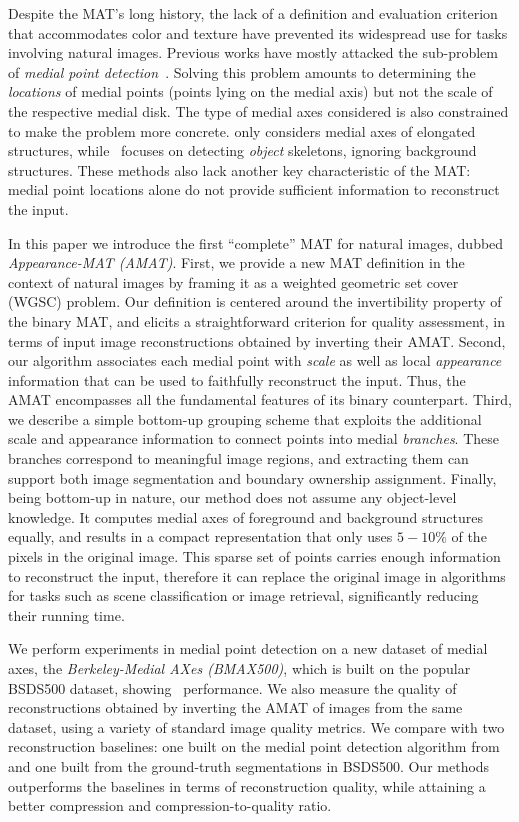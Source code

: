 \documentclass[10pt,twocolumn,letterpaper]{article}
\begin{document}
Despite the MAT's long history, the lack of a definition and evaluation criterion 
that accommodates color and texture have prevented its widespread use for tasks involving natural images.
Previous works have mostly attacked the sub-problem of \emph{medial point detection}~\cite{tsogkas2012learning,shen2016object}.
Solving this problem amounts to determining the \emph{locations} of medial points (points lying on the medial axis) 
but not the scale of the respective medial disk.
The type of medial axes considered is also constrained to make the problem more concrete.
\cite{tsogkas2012learning} only considers medial axes of elongated structures, while~\cite{shen2016object} 
focuses on detecting \emph{object} skeletons, ignoring background structures.
These methods also lack another key characteristic of the MAT: medial point locations alone do not provide sufficient
information to reconstruct the input.

In this paper we introduce the first ``complete'' MAT for natural images, dubbed \emph{Appearance-MAT (AMAT)}.
First, we provide a new MAT definition in the context of natural images by framing it 
as a weighted geometric set cover (WGSC) problem.
Our definition is centered around the invertibility property of the binary MAT, and elicits 
a straightforward criterion for quality assessment, in terms of input image reconstructions obtained by inverting their AMAT.
Second, our algorithm associates each medial point with \emph{scale} as well as local \emph{appearance} information
that can be used to faithfully reconstruct the input.
Thus, the AMAT encompasses all the fundamental features of its  binary counterpart. 
Third, we describe a simple bottom-up grouping scheme that exploits the additional scale and appearance information to connect
points into medial \emph{branches}.
These branches correspond to meaningful image regions, and extracting them can support both image segmentation
and boundary ownership assignment.
Finally, being bottom-up in nature, our method does not assume any object-level knowledge.
It computes medial axes of foreground and background structures equally, 
and results in a compact representation that only uses $5-10\%$ of the pixels in the original image.
This sparse set of points carries enough information to reconstruct the input, therefore it
can replace the original image in algorithms for tasks such as scene classification 
or image retrieval, significantly reducing their running time.

We perform experiments in medial point detection on a new dataset of medial axes, the 
\emph{Berkeley-Medial AXes (BMAX500)}, which is built on the popular BSDS500 dataset, showing \sota\ performance.
We also measure the quality of reconstructions  obtained by inverting the AMAT of images from the same dataset, 
using  a variety of standard image quality metrics.
We compare with two reconstruction baselines: one built on the medial point detection algorithm from~\cite{tsogkas2012learning}
and one built from the ground-truth segmentations in BSDS500.
Our methods outperforms the baselines in terms of reconstruction quality, while attaining a better compression and
compression-to-quality ratio.
\end{document}
